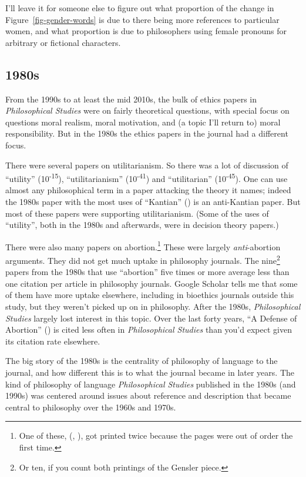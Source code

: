 \documentclass[
  10pt,
  letterpaper,
  DIV=11,
  numbers=noendperiod,
  twoside]{scrartcl}
\begin{document}
I'll leave it for someone else to figure out what proportion of the
change in Figure~\ref{fig-gender-words} is due to there being more
references to particular women, and what proportion is due to
philosophers using female pronouns for arbitrary or fictional
characters.

\subsection{1980s}\label{sec-1980s-articles}

From the 1990s to at least the mid 2010s, the bulk of ethics papers in
\emph{Philosophical Studies} were on fairly theoretical questions, with
special focus on questions moral realism, moral motivation, and (a topic
I'll return to) moral responsibility. But in the 1980s the ethics papers
in the journal had a different focus.

There were several papers on utilitarianism. So there was a lot of
discussion of ``utility'' (10\textsuperscript{-15}), ``utilitarianism''
(10\textsuperscript{-41}) and ``utilitarian'' (10\textsuperscript{-45}).
One can use almost any philosophical term in a paper attacking the
theory it names; indeed the 1980s paper with the most uses of
``Kantian'' () is an
anti-Kantian paper. But most of these papers were supporting
utilitarianism. (Some of the uses of ``utility'', both in the 1980s and
afterwards, were in decision theory papers.)

There were also many papers on abortion.\footnote{One of these,
  (,
  ), got printed twice because
  the pages were out of order the first time.} These were largely
\emph{anti}-abortion arguments. They did not get much uptake in
philosophy journals. The nine\footnote{Or ten, if you count both
  printings of the Gensler piece.} papers from the 1980s that use
``abortion'' five times or more average less than one citation per
article in philosophy journals. Google Scholar tells me that some of
them have more uptake elsewhere, including in bioethics journals outside
this study, but they weren't picked up on in philosophy. After the
1980s, \emph{Philosophical Studies} largely lost interest in this topic.
Over the last forty years, ``A Defense of Abortion''
() is cited less often in
\emph{Philosophical Studies} than you'd expect given its citation rate
elsewhere.

The big story of the 1980s is the centrality of philosophy of language
to the journal, and how different this is to what the journal became in
later years. The kind of philosophy of language \emph{Philosophical
Studies} published in the 1980s (and 1990s) was centered around issues
about reference and description that became central to philosophy over
the 1960s and 1970s.
\end{document}
